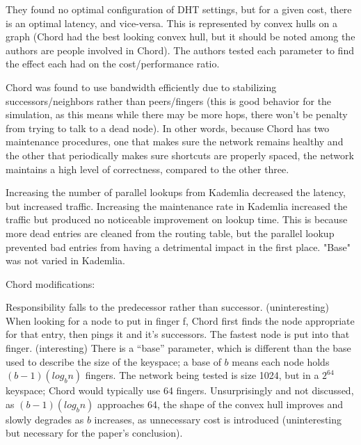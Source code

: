 \documentclass[10pt,letterpaper]{report}
\begin{document}
They found no optimal configuration of DHT settings, but for a given cost, there is an optimal latency, and vice-versa.  This is represented by convex hulls on a graph (Chord had the best looking convex hull, but it should be noted among the authors are people involved in Chord).   The authors tested each parameter to find the effect each had on the cost/performance ratio.

Chord was found to use bandwidth efficiently due to stabilizing successors/neighbors rather than peers/fingers  (this is good behavior for the simulation, as this means while there may be more hops, there won't be penalty from trying to talk to a dead node).  In other words, because Chord has two maintenance procedures, one that makes sure the network remains healthy and the other that periodically makes sure shortcuts are properly spaced, the network maintains a high level of correctness, compared to the other three.

Increasing the number of parallel lookups from Kademlia decreased the latency, but increased traffic.  Increasing the maintenance rate in Kademlia increased the traffic but produced no noticeable improvement on lookup time.  This is because more dead entries are cleaned from the routing table, but the parallel lookup prevented bad entries from having a detrimental impact in the first place.  "Base" was not varied in Kademlia.

Chord modifications:  

Responsibility falls to the predecessor rather than successor.   (uninteresting)
When looking for a node to put in finger f, Chord first finds the node appropriate for that entry, then pings it and it's successors.  The fastest node is put into that finger.  (interesting)
There is a ``base'' parameter, which is different than the base used to describe the size of the keyspace;  a base of $b$ means each node  holds $(b-1)(log_b n)$ fingers.  The network being tested is size 1024, but in a $2^64$ keyspace;  Chord would typically use 64 fingers.   Unsurprisingly and not discussed, as $(b-1)(log_b n)$ approaches 64, the shape of the convex hull improves and slowly degrades as $b$ increases, as unnecessary cost is introduced  (uninteresting but necessary for the paper's conclusion).
\end{document}
